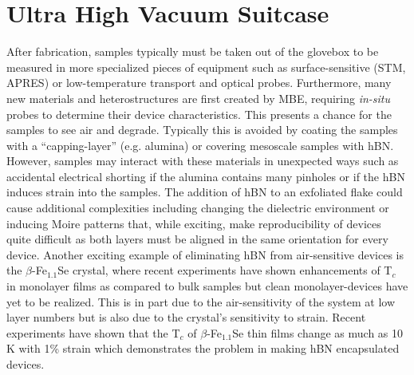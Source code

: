 \section{\label{sec:level4}Ultra High Vacuum Suitcase}
After fabrication, samples typically must be taken out of the glovebox to be measured in more specialized pieces of equipment such as surface-sensitive (STM, APRES) or low-temperature  transport and optical probes. Furthermore, many new materials and heterostructures are first created by MBE, requiring \textit{in-situ} probes to determine their device characteristics.\cite{Gerber2017FeSe,Wang2016,Hellman2017Rev} This presents a chance for the samples to see air and degrade. Typically this is avoided by coating the samples with a ``capping-layer'' (e.g. alumina) or covering mesoscale samples with hBN. However, samples may interact with these materials in unexpected ways such as accidental electrical shorting if the alumina contains many pinholes or if the hBN induces strain into the samples. The addition of hBN to an exfoliated flake could cause additional complexities including changing the dielectric environment or inducing Moire patterns that, while exciting, make reproducibility of devices quite difficult as both layers must be aligned in the same orientation for every device.\cite{Sharpe2019,Woods2014,doi:10.1021/nl5006542,Tran:2019aa,Jin:2019aa,Alexeev:2019aa,Yankowitz2019,Cao2018} Another exciting example of eliminating hBN from air-sensitive devices is the $\beta$-Fe$_{1.1}$Se crystal, where recent experiments have shown enhancements of T$_{c}$ in monolayer films as compared to bulk samples but clean monolayer-devices have yet to be realized.\cite{Gerber2017FeSe,Wang2016} This is in part due to the air-sensitivity of the system at low layer numbers but is also due to the crystal's sensitivity to strain.\cite{Yang2019} Recent experiments have shown that the T$_{c}$ of $\beta$-Fe$_{1.1}$Se thin films change as much as 10 K with 1\% strain which demonstrates the problem in making hBN encapsulated devices.\cite{Kawai2018} 

